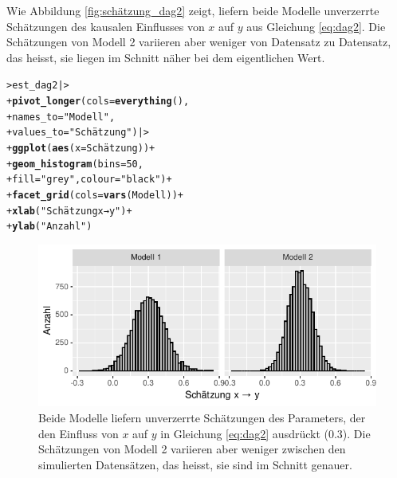\documentclass[oneside, 10pt]{book}\usepackage[]{graphicx}\usepackage[]{xcolor}
\makeatletter
\newcommand{\hlnum}[1]{\textcolor[rgb]{0.686,0.059,0.569}{#1}}%
\newcommand{\hlstr}[1]{\textcolor[rgb]{0.192,0.494,0.8}{#1}}%
\newcommand{\hlopt}[1]{\textcolor[rgb]{0,0,0}{#1}}%
\newcommand{\hlstd}[1]{\textcolor[rgb]{0.345,0.345,0.345}{#1}}%
\newcommand{\hlkwc}[1]{\textcolor[rgb]{0.333,0.667,0.333}{#1}}%
\newcommand{\hlkwd}[1]{\textcolor[rgb]{0.737,0.353,0.396}{\textbf{#1}}}%
\newenvironment{kframe}{%
 \def\at@end@of@kframe{}%
 \ifinner\ifhmode%
  \def\at@end@of@kframe{\end{minipage}}%
  \begin{minipage}{\columnwidth}%
 \fi\fi%
 \def\FrameCommand##1{\hskip\@totalleftmargin \hskip-\fboxsep
 \colorbox{shadecolor}{##1}\hskip-\fboxsep
     \hskip-\linewidth \hskip-\@totalleftmargin \hskip\columnwidth}%
 \MakeFramed {\advance\hsize-\width
   \@totalleftmargin\z@ \linewidth\hsize
   \@setminipage}}%
 {\par\unskip\endMakeFramed%
 \at@end@of@kframe}
\newenvironment{knitrout}{}{} %
\makeatother
\begin{document}
Wie Abbildung \ref{fig:schätzung_dag2} zeigt, liefern beide Modelle unverzerrte
Schätzungen des kausalen Einflusses von $x$ auf $y$ aus Gleichung \ref{eq:dag2}.
Die Schätzungen von Modell 2 variieren aber weniger von Datensatz zu Datensatz,
das heisst, sie liegen im Schnitt näher bei dem eigentlichen Wert.
\begin{knitrout}
\color{fgcolor}\begin{kframe}
\begin{alltt}
\hlstd{> }\hlstd{est_dag2 |>}
\hlstd{+ }  \hlkwd{pivot_longer}\hlstd{(}\hlkwc{cols} \hlstd{=} \hlkwd{everything}\hlstd{(),}
\hlstd{+ }               \hlkwc{names_to} \hlstd{=} \hlstr{"Modell"}\hlstd{,}
\hlstd{+ }               \hlkwc{values_to} \hlstd{=} \hlstr{"Schätzung"}\hlstd{) |>}
\hlstd{+ }  \hlkwd{ggplot}\hlstd{(}\hlkwd{aes}\hlstd{(}\hlkwc{x} \hlstd{= Schätzung))} \hlopt{+}
\hlstd{+ }  \hlkwd{geom_histogram}\hlstd{(}\hlkwc{bins} \hlstd{=} \hlnum{50}\hlstd{,}
\hlstd{+ }                 \hlkwc{fill} \hlstd{=} \hlstr{"grey"}\hlstd{,} \hlkwc{colour} \hlstd{=} \hlstr{"black"}\hlstd{)} \hlopt{+}
\hlstd{+ }  \hlkwd{facet_grid}\hlstd{(}\hlkwc{cols} \hlstd{=} \hlkwd{vars}\hlstd{(Modell))} \hlopt{+}
\hlstd{+ }  \hlkwd{xlab}\hlstd{(}\hlstr{"Schätzung x → y"}\hlstd{)} \hlopt{+}
\hlstd{+ }  \hlkwd{ylab}\hlstd{(}\hlstr{"Anzahl"}\hlstd{)}
\end{alltt}
\end{kframe}\begin{figure}[tp]

{\centering \includegraphics[width=.5\textwidth]{figs/unnamed-chunk-321-1} 

}

\caption{Beide Modelle liefern unverzerrte Schätzungen des Parameters, der den Einfluss von $x$ auf $y$ in Gleichung \ref{eq:dag2} ausdrückt (0.3). Die Schätzungen von Modell 2 variieren aber weniger zwischen den simulierten Datensätzen, das heisst, sie sind im Schnitt genauer.\label{fig:schätzung_dag2}}\label{fig:unnamed-chunk-321}
\end{figure}

\end{knitrout}
\end{document}
